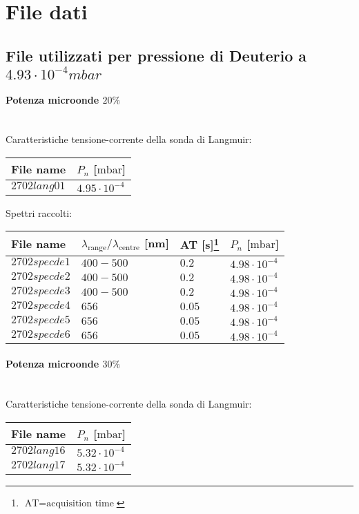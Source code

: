 \section{File dati}
\subsection{File utilizzati per pressione di Deuterio a $4.93\cdot10^{-4}mbar$}

\paragraph*{Potenza microonde $\text{20\%}$} ~\\
Caratteristiche tensione-corrente della sonda di Langmuir:
\begin{center}
\begin{tabular}{p{3cm}p{3cm}}
\toprule
File name	&$P_{n}$ [$\si{\milli\bar}$]\\
\midrule
$2702lang01$	&$4.95\cdot10^{-4}$\\
\bottomrule
\end{tabular}
\end{center}

Spettri raccolti:
\begin{center}
\begin{tabular}{p{3cm}p{4cm}p{2cm}p{3cm}}
\toprule
File name	&$\lambda_\text{range}\text{/}\lambda_\text{centre}$ [nm] &AT [s]\footnote{$\text{AT}=\text{acquisition time}$} &$P_{n}$ [$\si{\milli\bar}$]\\
\midrule
$2702specde1$	&$400-500$	&$0.2$		&$4.98\cdot10^{-4}$\\
$2702specde2$	&$400-500$	&$0.2$		&$4.98\cdot10^{-4}$\\
$2702specde3$	&$400-500$	&$0.2$		&$4.98\cdot10^{-4}$\\
$2702specde4$	&$656$		&$0.05$		&$4.98\cdot10^{-4}$\\
$2702specde5$	&$656$		&$0.05$		&$4.98\cdot10^{-4}$\\
$2702specde6$	&$656$		&$0.05$		&$4.98\cdot10^{-4}$\\

\bottomrule
\end{tabular}
\end{center}

\paragraph*{Potenza microonde $\text{30\%}$} ~\\
Caratteristiche tensione-corrente della sonda di Langmuir:
\begin{center}
  \begin{tabular}{p{3cm}p{3cm}}
  \toprule
File name	&$P_{n}$ [$\si{\milli\bar}$]\\
  \midrule
$2702lang16$	&$5.32\cdot10^{-4}$\\
$2702lang17$	&$5.32\cdot10^{-4}$\\

  \bottomrule
  \end{tabular}
\end{center}

